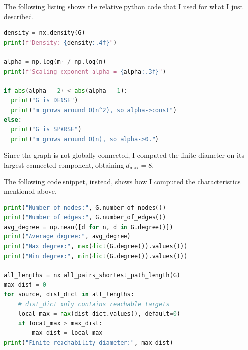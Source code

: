 \documentclass{article}
\begin{document}
The following listing shows the relative python code that I used for what I just described.
\begin{lstlisting}[language=Python, label=fig:code-density]
density = nx.density(G)
print(f"Density: {density:.4f}")

alpha = np.log(m) / np.log(n)
print(f"Scaling exponent alpha = {alpha:.3f}")

if abs(alpha - 2) < abs(alpha - 1):
  print("G is DENSE")
  print("m grows around O(n^2), so alpha->const")
else:
  print("G is SPARSE")
  print("m grows around O(n), so alpha->0.")
\end{lstlisting}

\vspace{0.5cm}

Since the graph is not globally connected, I computed the finite diameter on its largest connected component, obtaining $d_{\max} = 8$.

The following code snippet, instead, shows how I computed the characteristics mentioned above.
\begin{lstlisting}[language=Python, label=fig:code-part1]
print("Number of nodes:", G.number_of_nodes())
print("Number of edges:", G.number_of_edges())
avg_degree = np.mean([d for n, d in G.degree()])
print("Average degree:", avg_degree)
print("Max degree:", max(dict(G.degree()).values()))
print("Min degree:", min(dict(G.degree()).values()))

all_lengths = nx.all_pairs_shortest_path_length(G)
max_dist = 0
for source, dist_dict in all_lengths:
    # dist_dict only contains reachable targets
    local_max = max(dist_dict.values(), default=0)
    if local_max > max_dist:
        max_dist = local_max
print("Finite reachability diameter:", max_dist)
\end{lstlisting}
\end{document}
